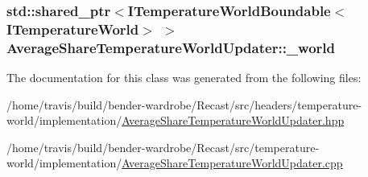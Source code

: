 \hypertarget{class_average_share_temperature_world_updater_a7327a9c0043f7fd278edcc1e7b7ecf78}{
\subsubsection[{\-\_\-world}]{\setlength{\rightskip}{0pt plus 5cm}std\-::shared\-\_\-ptr$<${\bf I\-Temperature\-World\-Boundable}$<${\bf I\-Temperature\-World}$>$ $>$ Average\-Share\-Temperature\-World\-Updater\-::\-\_\-world\hspace{0.3cm}{\ttfamily [protected]}}}\label{class_average_share_temperature_world_updater_a7327a9c0043f7fd278edcc1e7b7ecf78}


The documentation for this class was generated from the following files\-:\begin{DoxyCompactItemize}
\item 
/home/travis/build/bender-\/wardrobe/\-Recast/src/headers/temperature-\/world/implementation/\hyperlink{_average_share_temperature_world_updater_8hpp}{Average\-Share\-Temperature\-World\-Updater.\-hpp}\item 
/home/travis/build/bender-\/wardrobe/\-Recast/src/temperature-\/world/implementation/\hyperlink{_average_share_temperature_world_updater_8cpp}{Average\-Share\-Temperature\-World\-Updater.\-cpp}\end{DoxyCompactItemize}

